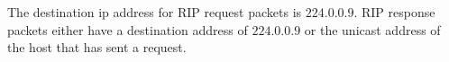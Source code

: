 The destination ip address for RIP request packets is $224.0.0.9$. RIP response packets either have a destination address of $224.0.0.9$ or the unicast address of the host that has sent a request.